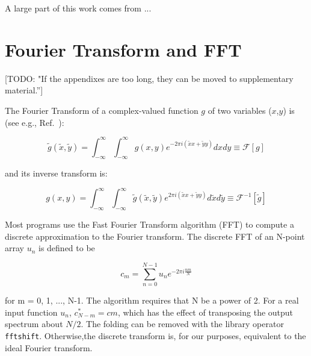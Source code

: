 \documentclass{iucr}              %
\newcommand{\todo}[1]{{\color{red}[TODO: "#1'']}}
\begin{document}
%
%
A large part of this work comes from ...

\appendix
\section{Fourier Transform and FFT}
\label{appendix: ft}

\todo{If the appendixes are too long, they can be moved to supplementary material.}

The Fourier Transform of a complex-valued function $g$ of two variables ($x$,$y$) is (see e.g., Ref.~\cite{goodmanfourier}): 

\begin{equation}
\tilde{g}(\tilde{x},\tilde{y}) = \int_{-\infty}^\infty \int_{-\infty}^\infty g(x,y) e^{-2 \pi i (\tilde{x}x + \tilde{y}y)} dx dy \equiv \mathcal{F}[g]
\end{equation}

and its inverse transform is: 

\begin{equation}
g(x,y) = \int_{-\infty}^\infty \int_{-\infty}^\infty \tilde{g}(\tilde{x},\tilde{y}) e^{2 \pi i (\tilde{x}x + \tilde{y}y)} d\tilde{x} d\tilde{y} \equiv \mathcal{F}^{-1}[\tilde{g}]
\end{equation}

Most programs use the Fast Fourier Transform algorithm (FFT) to compute a discrete approximation to the Fourier transform. The discrete FFT of an N-point array
$u_n$ is defined to be

\begin{equation}
 c_m = \sum_{n=0}^{N-1} u_n e^{-2 \pi i \frac{n m}{N}}
\end{equation}

for m = 0, 1, ..., N-1. The algorithm requires that N be a power of 2. For a real input function $u_n$, $c_{N-m}^\ast = cm$, which has the effect of transposing the output spectrum about $N/2$. The folding can be removed with the library operator {\tt fftshift}. Otherwise,the discrete transform is, for our purposes, equivalent to the ideal Fourier transform.
\end{document}
